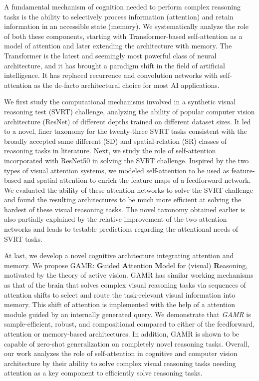 
A fundamental mechanism of cognition needed to perform complex reasoning tasks is the ability to selectively process information (attention) and retain information in an accessible state (memory). We systematically analyze the role of both these components, starting with Transformer-based self-attention as a model of attention and later extending the architecture with memory. The Transformer is the latest and seemingly most powerful class of neural architecture, and it has brought a paradigm shift in the field of artificial intelligence. It has replaced recurrence and convolution networks with self-attention as the de-facto architectural choice for most AI applications. 

We first study the computational mechanisms involved in a synthetic visual reasoning test (SVRT) challenge, analyzing the ability of popular computer vision architecture (ResNet) of different depths trained on different dataset sizes. It led to a novel, finer taxonomy for the twenty-three SVRT tasks consistent with the broadly accepted same-different (SD) and spatial-relation (SR) classes of reasoning tasks in literature. Next, we study the role of self-attention incorporated with ResNet50 in solving the SVRT challenge. Inspired by the two types of visual attention systems, we modeled self-attention to be used as feature-based and spatial attention to enrich the feature maps of a feedforward network. We evaluated the ability of these attention networks to solve the SVRT challenge and found the resulting architectures to be much more efficient at solving the hardest of these visual reasoning tasks. The novel taxonomy obtained earlier is also partially explained by the relative improvement of the two attention networks and leads to testable predictions regarding the attentional needs of SVRT tasks. 

At last, we develop a novel cognitive architecture integrating attention and memory. We propose GAMR: \textbf{G}uided \textbf{A}ttention \textbf{M}odel for (visual) \textbf{R}easoning, motivated by the theory of active vision. GAMR has similar working mechanisms as that of the brain that solves complex visual reasoning tasks via sequences of attention shifts to select and route the task-relevant visual information into memory. This shift of attention is implemented with the help of a attention module guided by an internally generated query. We demonstrate that \textit{GAMR} is sample-efficient, robust, and compositional compared to either of the feedforward, attention or memory-based architectures. In addition, GAMR is shown to be capable of zero-shot generalization on completely novel reasoning tasks. Overall, our work analyzes the role of self-attention in cognitive and computer vision architecture by their ability to solve complex visual reasoning tasks needing  attention as a key component to efficiently solve reasoning tasks.